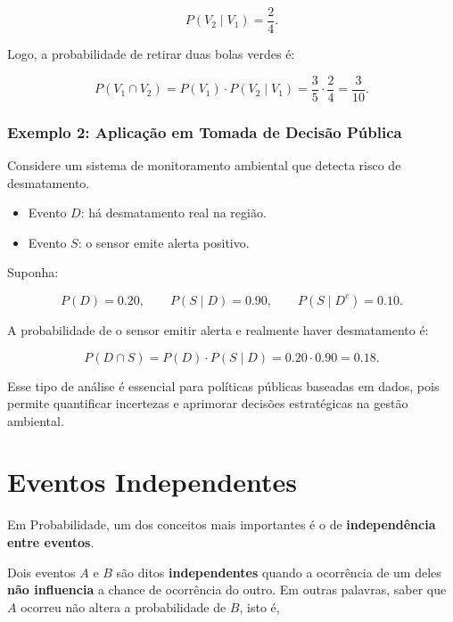 \begin{equation}
P(V_2\mid V_1)=\frac{2}{4}.
\end{equation}

Logo, a probabilidade de retirar duas bolas verdes é:

\begin{equation}
P(V_1\cap V_2)=P(V_1)\cdot P(V_2\mid V_1)
=\frac{3}{5}\cdot\frac{2}{4}
=\frac{3}{10}.
\end{equation}

\bigskip

\subsubsection{Exemplo 2: Aplicação em Tomada de Decisão Pública}

Considere um sistema de monitoramento ambiental que detecta risco de desmatamento.

\begin{itemize}
\item Evento $D$: há desmatamento real na região.
\item Evento $S$: o sensor emite alerta positivo.
\end{itemize}

Suponha:

\begin{equation}
P(D)=0.20,
\qquad
P(S\mid D)=0.90,
\qquad
P(S\mid D^c)=0.10.
\end{equation}

A probabilidade de o sensor emitir alerta e realmente haver desmatamento é:

\begin{equation}
P(D\cap S)=P(D)\cdot P(S\mid D)
=0.20\cdot0.90
=0.18.
\end{equation}

Esse tipo de análise é essencial para políticas públicas baseadas em dados,
pois permite quantificar incertezas e aprimorar decisões estratégicas na gestão
ambiental.


\section{Eventos Independentes}

Em Probabilidade, um dos conceitos mais importantes é o de \textbf{independência entre eventos}. \vskip0.3cm

Dois eventos $A$ e $B$ são ditos \textbf{independentes} quando a ocorrência de
um deles \textbf{não influencia} a chance de ocorrência do outro. Em outras palavras, saber que $A$ ocorreu não altera a probabilidade de $B$,
isto é,

